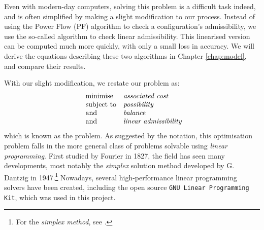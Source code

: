 \documentclass[main.tex]{subfiles}
\begin{document}
Even with modern-day computers, solving this problem is a difficult task indeed, and is often simplified by making a slight modification to our process. Instead of using the Power Flow (PF) algorithm to check a configuration's admissibility, we use the so-called  algorithm to check linear admissibility. This linearised version can be computed much more quickly, with only a small loss in accuracy. We will derive the equations describing these two algorithms in Chapter \ref{chap:model}, and compare their results.

With our slight modification, we restate our problem as:
\begin{equation*}
    \begin{array}{ll@{}}
\text{minimise}  & \textit{associated cost} \\
\text{subject to}& \textit{possibility} \\
\text{and}& \textit{balance} \\
\text{and}& \textit{linear admissibility}
\end{array}
\end{equation*}
which is known as the  problem. As suggested by the notation, this optimisation problem falls in the more general class of problems solvable using \emph{linear programming}. First studied by  Fourier in 1827, the field has seen many developments, most notably the \emph{simplex} solution method developed by G. Dantzig in 1947.\footnote{For the \emph{simplex method}, see \cite{Matousek2007} .}
Nowadays, several high-performance linear programming solvers have been created, including the open source \texttt{GNU Linear Programming Kit}, which was used in this project.
\end{document}
